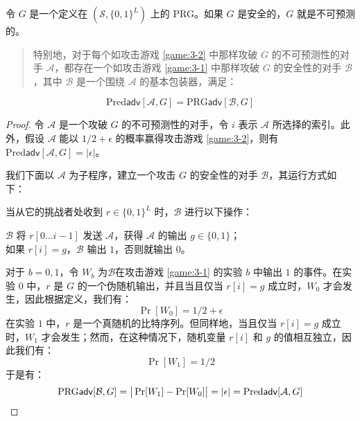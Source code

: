 \begin{theorem}\label{theo:3-4}
令 $G$ 是一个定义在 $(\mathcal{S},\{0,1\}^L)$ 上的 PRG。如果 $G$ 是安全的，$G$ 就是不可预测的。
\begin{quote}
特别地，对于每个如攻击游戏 \ref{game:3-2} 中那样攻破 $G$ 的不可预测性的对手 $\mathcal{A}$，都存在一个如攻击游戏 \ref{game:3-1} 中那样攻破 $G$ 的安全性的对手 $\mathcal{B}$，其中 $\mathcal{B}$ 是一个围绕 $\mathcal{A}$ 的基本包装器，满足：
\end{quote}
\[
\mathrm{Pred}\mathsf{adv}[\mathcal{A},G]
=
\mathrm{PRG}\mathsf{adv}[\mathcal{B},G]
\]
\end{theorem}

\begin{proof}
令 $\mathcal{A}$ 是一个攻破 $G$ 的不可预测性的对手，令 $i$ 表示 $\mathcal{A}$ 所选择的索引。此外，假设 $\mathcal{A}$ 能以 $1/2+\epsilon$ 的概率赢得攻击游戏 \ref{game:3-2}，则有 $\mathrm{Pred}\mathsf{adv}[\mathcal{A},G]=|\epsilon|$。

我们下面以 $\mathcal{A}$ 为子程序，建立一个攻击 $G$ 的安全性的对手 $\mathcal{B}$，其运行方式如下：

\vspace*{10pt}

\hspace*{5pt} 当从它的挑战者处收到 $r\in\{0,1\}^L$ 时，$\mathcal B$ 进行以下操作：

\vspace*{5pt}

\hspace*{28.5pt} $\mathcal{B}$ 将 $r[0\dots i-1]$ 发送 $\mathcal{A}$，获得 $\mathcal{A}$ 的输出 $g\in\{0,1\}$；\\
\hspace*{50pt} 如果 $r[i]=g$，$\mathcal{B}$ 输出 $1$，否则就输出 $0$。

\vspace*{10pt}

对于 $b=0,1$，令 $W_b$ 为$\mathcal{B}$在攻击游戏 \ref{game:3-1} 的实验 $b$ 中输出 $1$ 的事件。在实验 $0$ 中，$r$ 是 $G$ 的一个伪随机输出，并且当且仅当 $r[i]=g$ 成立时，$W_0$ 才会发生，因此根据定义，我们有：
\[
\Pr[W_0]=1/2+\epsilon
\]
在实验 $1$ 中，$r$ 是一个真随机的比特序列。但同样地，当且仅当 $r[i]=g$ 成立时，$W_1$ 才会发生；然而，在这种情况下，随机变量 $r[i]$ 和 $g$ 的值相互独立，因此我们有：
\[
\Pr[W_1]=1/2
\]
于是有：
\[
\mathrm{PRG}\mathsf{adv}[\mathcal{B},G]
=\big\lvert\Pr[W_1]-\Pr[W_0]\big\rvert
=|\epsilon|
=\mathrm{Pred}\mathsf{adv}[\mathcal{A},G]
\qedhere
\]
\end{proof}

